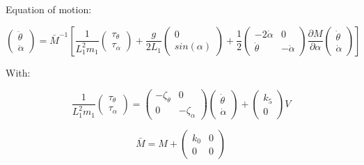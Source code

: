 
Equation of motion:

\begin{equation}
\left( \begin{matrix}
        \ddot \theta \\
        \ddot \alpha
    \end{matrix} \right) = \bar M^{-1} \left[
\frac{1}{ L_1^2 m_1}
    \left( \begin{matrix}
        \tau_{\theta} \\
        \tau_{\alpha}
    \end{matrix} \right)
    +\frac{g}{2L_1}
    \left( \begin{matrix}
        0 \\
        sin( \alpha)
    \end{matrix} \right)
     + \frac{1}{2} \left( \begin{matrix}
    - 2 \dot \alpha & 0\\
        \dot \theta & -\dot \alpha
    \end{matrix} \right)
    \frac{\partial M}{\partial \alpha}
     \left( \begin{matrix}
        \dot \theta \\
        \dot \alpha
    \end{matrix} \right) \right]
\end{equation}

With:

\begin{equation}
\frac{1}{ L_1^2 m_1}
    \left( \begin{matrix}
        \tau_{\theta} \\
        \tau_{\alpha}
    \end{matrix} \right)
    = \left( \begin{matrix}
        -\zeta_\theta & 0 \\ 0 & -\zeta_\alpha
    \end{matrix}\right)
    \left( \begin{matrix}
        \dot \theta \\ \dot \alpha
    \end{matrix}\right)
    +
    \left( \begin{matrix}
    k_5 \\ 0    
    \end{matrix}\right)
    V
\end{equation}


\begin{equation}
    \bar M = M + 
    \left( \begin{matrix}
       k_0 & 0 \\ 0 & 0
    \end{matrix} \right)
\end{equation}

